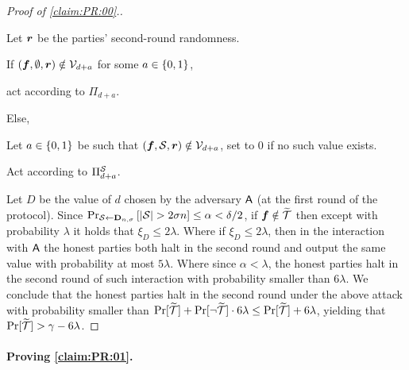 \begin{proof}[Proof of \cref{claim:PR:00}.]
{\begin{algorithm}[$\Ac$]
\begin{description}
Let ${ \boldsymbol{r}}$ be the parties' second-round randomness.

If $({ \boldsymbol{f}},\emptyset,{ \boldsymbol{r}}) \notin \mathcal{V}_{d+a}$ for some $a\in \{0,1\}$,

\quad act according to $\Pi_{d+a}$.

Else,

\quad Let $a\in \{0,1\}$ be such that $({ \boldsymbol{f}},{\cal{S}},{ \boldsymbol{r}}) \notin \mathcal{V}_{d+a}$, set to $0$ if no such value exists.

\quad Act according to $\Pi^{{\cal{S}}}_{d+a}$.
\end{description}			
\end{algorithm}
}

Let $D$ be the value of $d$ chosen by the adversary $\Ac$ (at the first round of the protocol).
Since $\Pr_{{\cal{S}} \gets \mathbf{D}_{n,\sigma}}\left[ \left|{\cal{S}}\right| > 2\sigma n\right] \le \alpha < \delta/2$,
if ${ \boldsymbol{f}} \notin {\widetilde{\mathcal{T}}}$ then except with probability $\lambda$ it holds that $\xi_D \le 2\lambda$. Where if $\xi_D \le 2\lambda$, then in the interaction with $\Ac$ the honest parties both halt in the second round and output the same value with probability at most $5\lambda$. Where since $\alpha < \lambda$, the honest parties halt in the second round of such interaction with probability smaller than $6\lambda$. We conclude that the honest parties halt in the second round under the above attack with probability smaller than $\Pr[{\widetilde{\mathcal{T}}}] + \Pr[\neg {\widetilde{\mathcal{T}}}]\cdot 6\lambda \le \Pr[{\widetilde{\mathcal{T}}}] + 6\lambda$, yielding that $\Pr[{\widetilde{\mathcal{T}}}] > \gamma- 6\lambda$.
\end{proof}

\paragraph{Proving \cref{claim:PR:01}.}

\newcommand{\oH}{{\overline{\cH}}}


